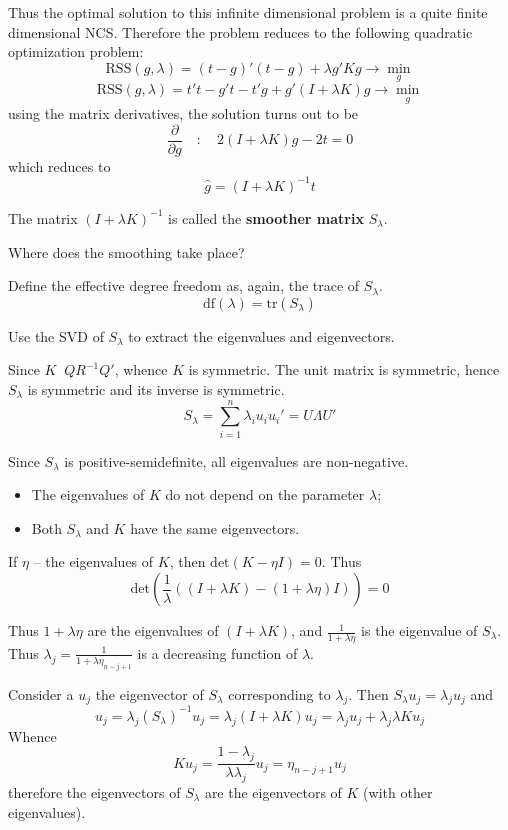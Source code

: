 \documentclass[a4paper]{article}
\newcommand{\brac}[1]{{\left ( #1 \right )}}
\newcommand{\RSS}{{\text{RSS}}}
\newcommand{\tr}{\text{tr}}
\newcommand{\defn}{\mathop{\overset{\Delta}{=}}\nolimits}
\begin{document}
Thus the optimal solution to this infinite dimensional problem is a quite finite dimensional NCS.
Therefore the problem reduces to the following quadratic optimization problem:
\[\RSS(g,\lambda) = {(t - g)}'{(t - g)} + \lambda g'K g \to \min_g\]
\[\RSS(g,\lambda) = t't - g't - t'g + g'( I + \lambda K )g  \to \min_g\]
using the matrix derivatives, the solution turns out to be
\[\frac{\partial}{\partial g} \quad:\quad 2( I + \lambda K )g - 2 t = 0\]
which reduces to
\[\hat{g} = \brac{I + \lambda K}^{-1} t\]

The matrix $\brac{I + \lambda K}^{-1}$ is called the \textbf{smoother matrix} $S_\lambda$.

Where does the smoothing take place? 

Define the effective degree freedom as, again, the trace of $S_\lambda$.
\[\text{df}(\lambda) = \tr\brac{S_\lambda}\]

Use the SVD of $S_\lambda$ to extract the eigenvalues and eigenvectors.

Since $K \defn Q R^{-1} Q'$, whence $K$ is symmetric. The unit matrix is symmetric, hence $S_\lambda$ is symmetric and its inverse is symmetric.
\[S_\lambda = \sum_{i=1}^n \lambda_i u_i u_i' = U\Lambda U'\]

Since  $S_\lambda$ is positive-semidefinite, all eigenvalues are non-negative.

\begin{itemize}
	\item The eigenvalues of $K$ do not depend on the parameter $\lambda$;
	\item Both $S_\lambda$ and $K$ have the same eigenvectors.
\end{itemize}

If $\eta$ -- the eigenvalues of $K$, then $\text{det}\brac{K-\eta I} = 0$.
Thus \[\text{det}\brac{\frac{1}{\lambda}\brac{\brac{I+\lambda K} -(1 + \lambda \eta) I} } = 0\]

Thus $1 + \lambda \eta$ are the eigenvalues of $\brac{I+\lambda K}$, and $\frac{1}{1 + \lambda \eta}$ is the eigenvalue of $S_\lambda$.
Thus $\lambda_j = \frac{1}{1+\lambda \eta_{n-j+1}}$ is a decreasing function of $\lambda$.

Consider a $u_j$ the eigenvector of $S_\lambda$ corresponding to $\lambda_j$.
Then $S_\lambda u_j = \lambda_j u_j$ and
\[u_j = \lambda_j \brac{S_\lambda}^{-1} u_j
= \lambda_j \brac{I+\lambda K} u_j
= \lambda_j u_j + \lambda_j \lambda K u_j\]
Whence
\[K u_j = \frac{1-\lambda_j}{\lambda \lambda_j} u_j = \eta_{n-j+1} u_j\]
therefore the eigenvectors of $S_\lambda$ are the eigenvectors of $K$ (with other eigenvalues).
\end{document}
